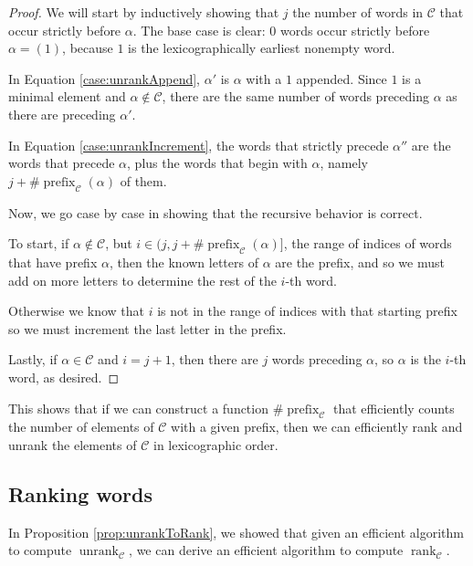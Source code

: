 \begin{proof}
  We will start by inductively showing that $j$ the number of words in
  $\mathcal{C}$ that occur strictly before $\alpha$.
  The base case is clear: $0$ words occur strictly before $\alpha = (1)$,
  because $1$ is the lexicographically earliest nonempty word.

  In Equation \ref{case:unrankAppend}, $\alpha'$ is $\alpha$ with a $1$
  appended. Since $1$ is a minimal element and $\alpha \not\in \mathcal{C}$,
  there are the same number of words preceding $\alpha$ as there are preceding
  $\alpha'$.

  In Equation \ref{case:unrankIncrement}, the words that strictly precede
  $\alpha''$ are the words that precede $\alpha$, plus the words that begin
  with $\alpha$, namely $j + \#\operatorname{prefix}_\mathcal{C}(\alpha)$ of
  them.

  Now, we go case by case in showing that the recursive behavior is correct.

  To start, if $\alpha \not\in \mathcal{C}$, but
  $i \in (j, j + \#\operatorname{prefix}_\mathcal{C}(\alpha)]$,
  the range of indices of words that have prefix $\alpha$, then the known letters
  of $\alpha$ are the prefix, and so we must add on more letters to determine
  the rest of the $i$-th word.

  Otherwise we know that $i$ is not in the range of indices with that starting
  prefix so we must increment the last letter in the prefix.

  Lastly, if $\alpha \in \mathcal{C}$ and $i = j + 1$, then there are
  $j$ words preceding $\alpha$, so $\alpha$ is the $i$-th word, as desired.
\end{proof}

This shows that if we can construct a function
$\#\operatorname{prefix}_\mathcal{C}$ that efficiently counts the number of
elements of $\mathcal{C}$ with a given prefix, then we can efficiently rank and
unrank the elements of $\mathcal{C}$ in lexicographic order.

\subsection{Ranking words}
In Proposition \ref{prop:unrankToRank}, we showed that given an efficient algorithm
to compute $\operatorname{unrank}_\mathcal{C}$, we can derive an efficient
algorithm to compute $\operatorname{rank}_\mathcal{C}$.

